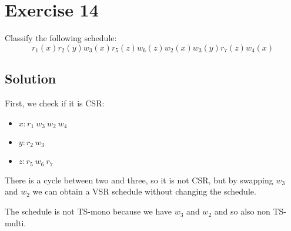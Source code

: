 \section{Exercise 14}

Classify the following schedule:
\[r_1(x) r_2(y) w_3(x) r_5(z) w_6(z) w_2(x) w_3(y) r_7(z) w_4(x)\] 

\subsection*{Solution}
First, we check if it is CSR:
\begin{itemize}
    \item $x: r_1 \: w_3 \: w_2 \: w_4$
    \item $y: r_2 \: w_3$
    \item $z: r_5 \: w_6 \: r_7$
\end{itemize}
There is a cycle between two and three, so it is not CSR, but by swapping $w_3$ and $w_2$ we can obtain a VSR schedule without changing the schedule. 

The schedule is not TS-mono because we have $w_3$ and $w_2$ and so also non TS-multi. 